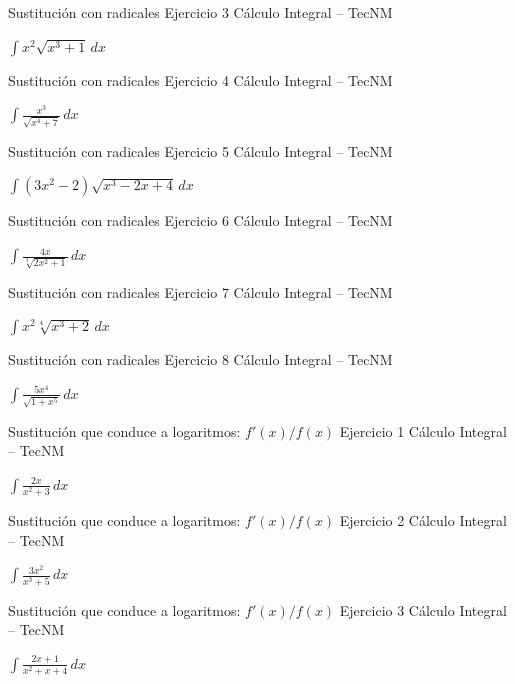 \documentclass[aspectratio=169,12pt]{beamer}
\newcommand{\ejercicio}[1]{%
  \begin{center}
  \vfill
  {\fontsize{24}{30}\selectfont #1}
  \vfill
  \end{center}
}
\begin{document}
\begin{frame}{Sustitución con radicales}
\small Ejercicio 3 \hfill Cálculo Integral -- TecNM
\ejercicio{$\displaystyle \int x^2\sqrt{x^3+1}\,dx$}
\end{frame}

\begin{frame}{Sustitución con radicales}
\small Ejercicio 4 \hfill Cálculo Integral -- TecNM
\ejercicio{$\displaystyle \int\frac{x^3}{\sqrt{x^4+7}}\,dx$}
\end{frame}

\begin{frame}{Sustitución con radicales}
\small Ejercicio 5 \hfill Cálculo Integral -- TecNM
\ejercicio{$\displaystyle \int(3x^2-2)\sqrt{x^3-2x+4}\,dx$}
\end{frame}

\begin{frame}{Sustitución con radicales}
\small Ejercicio 6 \hfill Cálculo Integral -- TecNM
\ejercicio{$\displaystyle \int\frac{4x}{\sqrt[3]{2x^2+1}}\,dx$}
\end{frame}

\begin{frame}{Sustitución con radicales}
\small Ejercicio 7 \hfill Cálculo Integral -- TecNM
\ejercicio{$\displaystyle \int x^2\sqrt[4]{x^3+2}\,dx$}
\end{frame}

\begin{frame}{Sustitución con radicales}
\small Ejercicio 8 \hfill Cálculo Integral -- TecNM
\ejercicio{$\displaystyle \int\frac{5x^4}{\sqrt{1+x^5}}\,dx$}
\end{frame}

\begin{frame}{Sustitución que conduce a logaritmos: $f'(x)/f(x)$}
\small Ejercicio 1 \hfill Cálculo Integral -- TecNM
\ejercicio{$\displaystyle \int\frac{2x}{x^2+3}\,dx$}
\end{frame}

\begin{frame}{Sustitución que conduce a logaritmos: $f'(x)/f(x)$}
\small Ejercicio 2 \hfill Cálculo Integral -- TecNM
\ejercicio{$\displaystyle \int\frac{3x^2}{x^3+5}\,dx$}
\end{frame}

\begin{frame}{Sustitución que conduce a logaritmos: $f'(x)/f(x)$}
\small Ejercicio 3 \hfill Cálculo Integral -- TecNM
\ejercicio{$\displaystyle \int\frac{2x+1}{x^2+x+4}\,dx$}
\end{frame}
\end{document}
